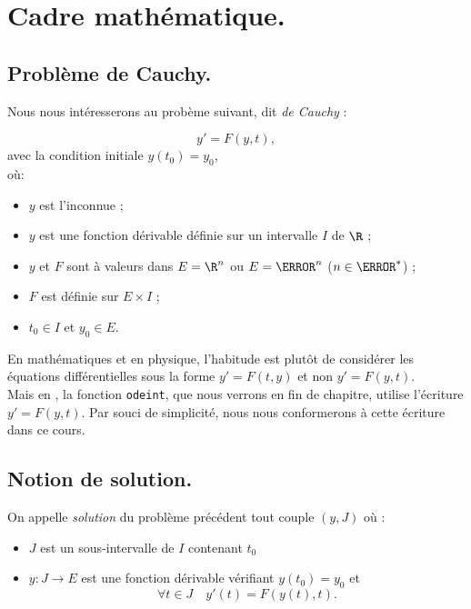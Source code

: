 \section{Cadre mathématique.}

\subsection{Problème de Cauchy.}

Nous nous intéresserons au probème suivant, dit \emph{de Cauchy} :

\begin{equation}
  \label{eq:o1}
  y' = F(y,t),
\end{equation}
avec la condition initiale $y(t_{0})=y_{0}$,\\

\clearslide{}
où:
\begin{itemize}
\item $y$ est l'inconnue ;
\item $y$ est une fonction dérivable définie sur un intervalle $I$ de $\R$ ;
\item $y$ et $F$ sont à valeurs dans $E = \R^{n}$ ou $E=\C^{n}$ ($n\in\N^{*}$) ;
\item $F$ est définie sur $E\times I$ ;
\item $t_{0}\in I$ et $y_{0}\in E$.
\end{itemize}

\clearslide{}

\begin{rem}
En mathématiques et en physique, l'habitude est plutôt de considérer les équations 
différentielles sous la forme $y'=F(t,y)$ et non $y'=F(y,t)$.\\
Mais en \python, la fonction \texttt{odeint}, que nous verrons en fin de chapitre, 
utilise l'écriture $y'=F(y,t)$. Par souci de simplicité, nous nous conformerons à cette 
écriture dans ce cours.
\end{rem}


\clearslide{}
\subsection{Notion de solution.}

On appelle \emph{solution} du problème précédent tout couple $(y,J)$ où :
\begin{itemize}
\item $J$ est un sous-intervalle de $I$ contenant $t_{0}$
\item $y : J\to E$ est une fonction dérivable vérifiant $y(t_{0})=y_{0}$ et
  \begin{equation*}
    \forall t \in J\quad y'(t)=F(y(t),t).
  \end{equation*}
\end{itemize}

